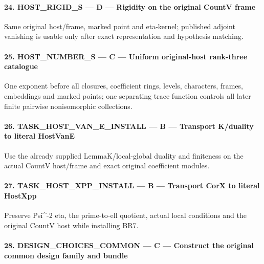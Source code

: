 \paragraph{24. HOST\_\allowbreak{}RIGID\_\allowbreak{}S — D — Rigidity on the original CountV frame}

Same original host/\allowbreak{}frame, marked point and eta-kernel; published adjoint vanishing is usable only after exact representation and hypothesis matching.

\paragraph{25. HOST\_\allowbreak{}NUMBER\_\allowbreak{}S — C — Uniform original-host rank-three catalogue}

One exponent before all closures, coefficient rings, levels, characters, frames, embeddings and marked points; one separating trace function controls all later finite pairwise nonisomorphic collections.

\paragraph{26. TASK\_\allowbreak{}HOST\_\allowbreak{}VAN\_\allowbreak{}E\_\allowbreak{}INSTALL — B — Transport K/\allowbreak{}duality to literal HostVanE}

Use the already supplied LemmaK/\allowbreak{}local-global duality and finiteness on the actual CountV host/\allowbreak{}frame and exact original coefficient modules.

\paragraph{27. TASK\_\allowbreak{}HOST\_\allowbreak{}XPP\_\allowbreak{}INSTALL — B — Transport CorX to literal HostXpp}

Preserve Psi\textasciicircum{}-2 eta, the prime-to-ell quotient, actual local conditions and the original CountV host while installing BR7.

\paragraph{28. DESIGN\_\allowbreak{}CHOICES\_\allowbreak{}COMMON — C — Construct the original common design family and bundle}

